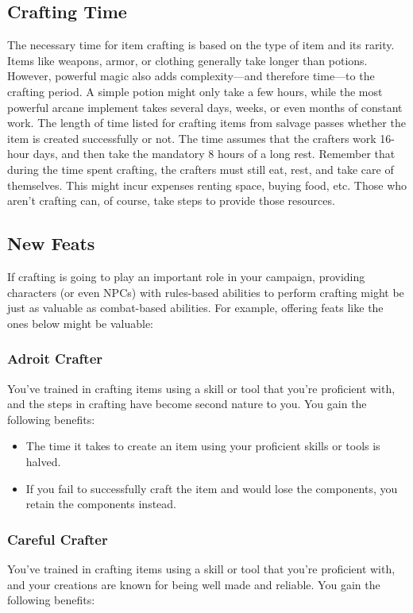 \documentclass[10pt,a4paper,twoside,twocolumn,openany,bg=print,nodeprecatedcode]{dndbook}
\begin{document}
\subsection{Crafting Time}
The necessary time for item crafting is based on the type of item and its rarity. Items like weapons, armor, or clothing generally take longer than potions. However, powerful magic also adds complexity—and therefore time—to the crafting period. A simple potion might only take a few hours, while the most powerful arcane implement takes several days, weeks, or even months of constant work.
The length of time listed for crafting items from salvage passes whether the item is created successfully or not. The time assumes that the crafters work 16-hour days, and then take the mandatory 8 hours of a long rest.
Remember that during the time spent crafting, the crafters must still eat, rest, and take care of themselves. This might incur expenses renting space, buying food, etc. Those who aren't crafting can, of course, take steps to provide those resources.
\subsection{New Feats}
If crafting is going to play an important role in your campaign, providing characters (or even NPCs) with rules-based abilities to perform crafting might be just as valuable as combat-based abilities. For example, offering feats like the ones below might be valuable:
\subsubsection{Adroit Crafter}
You've trained in crafting items using a skill or tool that you're proficient with, and the steps in crafting have become second nature to you. You gain the following benefits:

\begin{itemize}
\item The time it takes to create an item using your proficient skills or tools is halved.
\item If you fail to successfully craft the item and would lose the components, you retain the components instead.
\end{itemize}

\subsubsection{Careful Crafter}
You've trained in crafting items using a skill or tool that you're proficient with, and your creations are known for being well made and reliable. You gain the following benefits:
\end{document}
